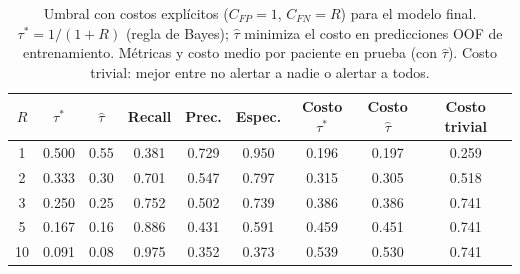 \begin{table}[!tp]
\centering
\footnotesize
\caption{Umbral con costos explícitos ($C_{FP}=1$, $C_{FN}=R$) para el modelo final. $\tau^{*}=1/(1+R)$ (regla de Bayes); $\hat\tau$ minimiza el costo en predicciones OOF de entrenamiento. Métricas y costo medio por paciente en prueba (con $\hat\tau$). Costo trivial: mejor entre no alertar a nadie o alertar a todos.}
\label{tab:costs}
\setlength{\tabcolsep}{4pt}
\begin{tabular}{ccccccccc}
\toprule
$R$ & $\tau^{*}$ & $\hat\tau$ & Recall & Prec. & Espec. & Costo $\tau^{*}$ & Costo $\hat\tau$ & Costo trivial \\
\midrule
1 & 0.500 & 0.55 & 0.381 & 0.729 & 0.950 & 0.196 & 0.197 & 0.259 \\
2 & 0.333 & 0.30 & 0.701 & 0.547 & 0.797 & 0.315 & 0.305 & 0.518 \\
3 & 0.250 & 0.25 & 0.752 & 0.502 & 0.739 & 0.386 & 0.386 & 0.741 \\
5 & 0.167 & 0.16 & 0.886 & 0.431 & 0.591 & 0.459 & 0.451 & 0.741 \\
10 & 0.091 & 0.08 & 0.975 & 0.352 & 0.373 & 0.539 & 0.530 & 0.741 \\
\bottomrule
\end{tabular}
\end{table}
